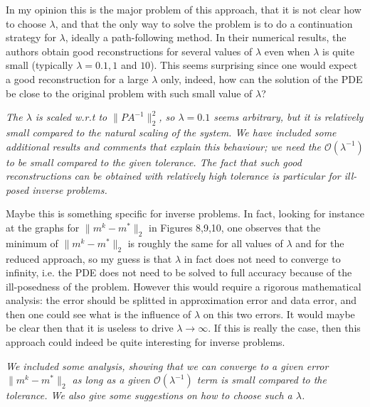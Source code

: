 \documentclass[12pt]{article}
\begin{document}
\vspace{5mm}

In my opinion this is the major problem of this approach, that it is not clear how to choose $\lambda$, and that the only way to solve the problem is to do a continuation strategy for $\lambda$, ideally a path-following method. In their numerical results, the authors obtain good reconstructions for several values of $\lambda$ even when $\lambda$ is quite small (typically $\lambda=0.1,1$ and $10$). This seems surprising since one would expect a good reconstruction for a large $\lambda$ only, indeed, how can the solution of the PDE be close to the original problem with such small value of $\lambda$? 

\vspace{5mm}

\emph{The $\lambda$ is scaled w.r.t to $\|PA^{-1}\|^2_2$, so $\lambda=0.1$ seems arbitrary, but it is relatively small compared to the natural scaling of the system. We have included some additional results and comments that explain this behaviour; we need the $\mathcal{O}(\lambda^{-1})$ to be small compared to the given tolerance. The fact that such good reconstructions can be obtained with relatively high tolerance is particular for ill-posed inverse problems.}

\vspace{5mm}

Maybe this is something specific for inverse problems. In fact, looking for instance at the graphs for $\|m^k - m^*\|_2$ in Figures 8,9,10, one observes that the minimum of $\|m^k - m^*\|_2$ is roughly the same for all values of $\lambda$ and for the reduced approach, so my guess is that $\lambda$ in fact does not need to converge to infinity, i.e. the PDE does not need to be solved to full accuracy because of the ill-posedness of the problem. However this would require a rigorous mathematical analysis: the error should be splitted in approximation error and data error, and then one could see what is the influence of $\lambda$ on this two errors. It would maybe be clear then that it is useless to drive $\lambda\to\infty$. If this is really the case, then this approach could indeed be quite interesting for inverse problems. 

\vspace{5mm}

\emph{We included some analysis, showing that we can converge to a given error $\|m^k - m^*\|_2$ as long as a given $\mathcal{O}(\lambda^{-1})$ term is small compared to the tolerance. We also give some suggestions on how to choose such a $\lambda$.}
\end{document}

